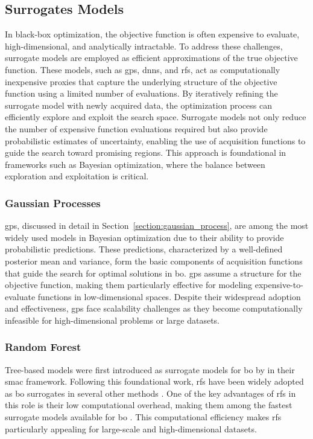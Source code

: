  
\subsection{Surrogates Models}
In black-box optimization, the objective function is often expensive to evaluate, high-dimensional, and analytically intractable. To address these challenges, surrogate models are employed as efficient approximations of the true objective function. These models, such as \acfp{gp}, \acfp{dnn}, and \acfp{rf}, act as computationally inexpensive proxies that capture the underlying structure of the objective function using a limited number of evaluations. By iteratively refining the surrogate model with newly acquired data, the optimization process can efficiently explore and exploit the search space. Surrogate models not only reduce the number of expensive function evaluations required but also provide probabilistic estimates of uncertainty, enabling the use of acquisition functions to guide the search toward promising regions. This approach is foundational in frameworks such as Bayesian optimization, where the balance between exploration and exploitation is critical.

\subsubsection{Gaussian Processes}

\acfp{gp}, discussed in detail in Section~\ref{section:gaussian_process}, are among the most widely used models in Bayesian optimization due to their ability to provide probabilistic predictions. These predictions, characterized by a well-defined posterior mean and variance, form the basic components of acquisition functions that guide the search for optimal solutions in \ac{bo}. \acp{gp} assume a structure for the objective function, making them particularly effective for modeling expensive-to-evaluate functions in low-dimensional spaces. Despite their widespread adoption and effectiveness, \acp{gp} face scalability challenges as they become computationally infeasible for high-dimensional problems or large datasets. 
\subsubsection{Random Forest}
Tree-based models were first introduced as surrogate models for \ac{bo} by \citet{hutter2011sequential} in their \ac{smac} framework. Following this foundational work, \acfp{rf} have been widely adopted as \ac{bo} surrogates in several other methods \citep{feurer2015efficient, lindauer2022smac3}. One of the key advantages of \acp{rf} in this role is their low computational overhead, making them among the fastest surrogate models available for \ac{bo} \citep{kim2022uncertainty}. This computational efficiency makes \acp{rf} particularly appealing for large-scale and high-dimensional datasets. 

